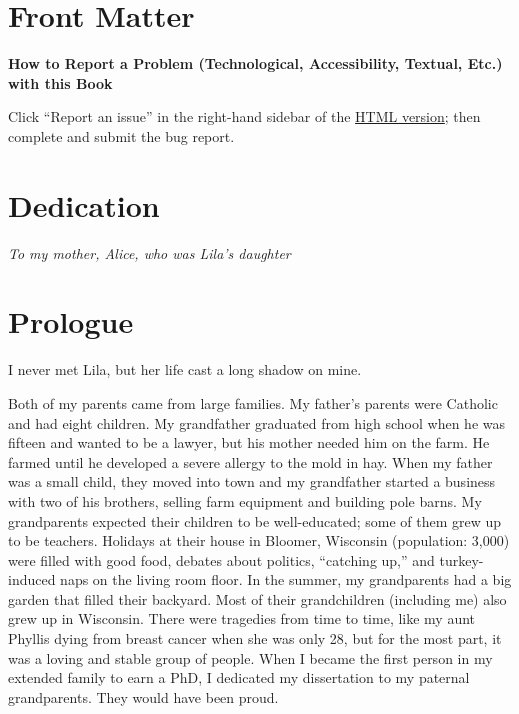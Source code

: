 \documentclass[
  american,
  letterpaper,
]{book}
\renewcommand*\contentsname{Table of contents}
\newcommand\contentsname{Table of contents}
\begin{document}

\renewcommand*\contentsname{Table of Contents}
{
\hypersetup{linkcolor=blue}
\setcounter{tocdepth}{2}
\tableofcontents
}
\listoffigures

\mainmatter
{}

\chapter{Front Matter}\label{front-matter}

\textbf{How to Report a Problem (Technological, Accessibility, Textual,
Etc.) with this Book}

Click ``Report an issue'' in the right-hand sidebar of the
\href{https://iulibrariespublishing.iu.edu/afterthought/}{HTML version};
then complete and submit the bug report.


\chapter{Dedication}\label{dedication}

\emph{To my mother, Alice, who was Lila's daughter}


\chapter{Prologue}\label{prologue}

I never met Lila, but her life cast a long shadow on mine.

Both of my parents came from large families. My father's parents were
Catholic and had eight children. My grandfather graduated from high
school when he was fifteen and wanted to be a lawyer, but his mother
needed him on the farm. He farmed until he developed a severe allergy to
the mold in hay. When my father was a small child, they moved into town
and my grandfather started a business with two of his brothers, selling
farm equipment and building pole barns. My grandparents expected their
children to be well-educated; some of them grew up to be teachers.
Holidays at their house in Bloomer, Wisconsin (population: 3,000) were
filled with good food, debates about politics, ``catching up,'' and
turkey-induced naps on the living room floor. In the summer, my
grandparents had a big garden that filled their backyard. Most of their
grandchildren (including me) also grew up in Wisconsin. There were
tragedies from time to time, like my aunt Phyllis dying from breast
cancer when she was only 28, but for the most part, it was a loving and
stable group of people. When I became the first person in my extended
family to earn a PhD, I dedicated my dissertation to my paternal
grandparents. They would have been proud.
\end{document}
